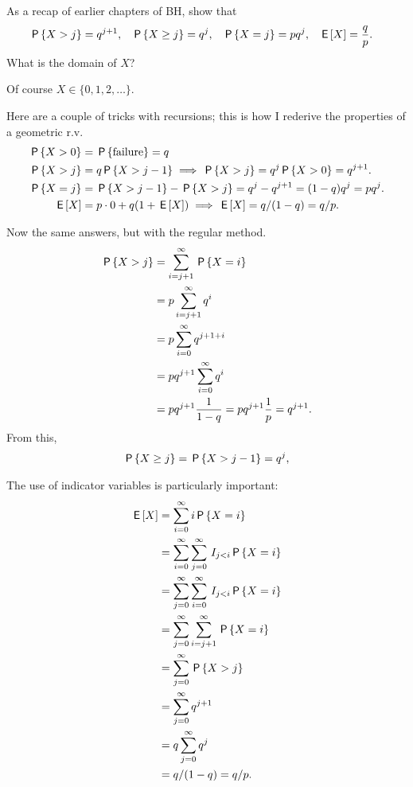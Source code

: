 \documentclass[a4paper,11pt]{article}
\begin{document}
\begin{exercise}
As a recap of earlier chapters of BH, show that
\begin{align}
  \label{eq:9}
\P{X>j} &= q^{j+1}, &\P{X\geq j} &=q^j, & \P{X=j} &= pq^{j}, & \E{X}&=\frac q{p}.
 \end{align}
What is the domain of $X$?
\begin{solution}
Of course $X \in \{0, 1, 2, \ldots\}$.

Here are a couple of tricks with recursions; this is how I rederive the properties of a geometric r.v.
\begin{align}
  \label{eq:8}
\P{X>0} &= \P{\textrm{failure}} = q\\
\P{X>j} &= q \P{X>j-1} \implies \P{X>j}=q^{j}\P{X>0} = q^{j+1}.\\
\P{X=j} &= \P{X>j-1} - \P{X>j} = q^{j}-q^{j+1} = (1-q)q^{j} = p q^{j}.\\
\E X &= p\cdot 0 + q(1+\E X) \implies \E X = q/(1-q) = q/p.
\end{align}

Now the same answers, but with the regular method.
  \begin{align}
    \label{eq:5}
\P{X>j}
&= \sum_{i=j+1}^{\infty} \P{X=i} \\
&= p\sum_{i=j+1}^{\infty} q^{i} \\
&= p\sum_{i=0}^{\infty} q^{j+1+i} \\
&= pq^{j+1}\sum_{i=0}^{\infty} q^{i} \\
&= pq^{j+1}\frac 1 {1-q} = p q^{j+1} \frac 1 p = q^{j+1}.
  \end{align}
From this,
  \begin{align}
    \label{eq:56}
  \P{X\geq j}  &= \P{X>j-1} = q^{j}, \\
  \end{align}

The use of indicator variables is particularly important:
  \begin{align}
    \label{eq:58}
\E X
&= \sum_{i=0}^{\infty} i\P{X=i} \\
&=  \sum_{i=0}^{\infty} \sum_{j=0}^{\infty} \1{j<i} \P{X=i} \\
&=  \sum_{j=0}^{\infty} \sum_{i=0}^{\infty} \1{j<i} \P{X=i} \\
&=  \sum_{j=0}^{\infty} \sum_{i=j+1}^{\infty}  \P{X=i} \\
&=  \sum_{j=0}^{\infty}  \P{X>j} \\
&=  \sum_{j=0}^{\infty}  q^{j+1}\\
&=  q \sum_{j=0}^{\infty}  q^{j}\\
&=  q/(1-q) = q/p.
  \end{align}

\end{solution}
\end{exercise}
\end{document}
